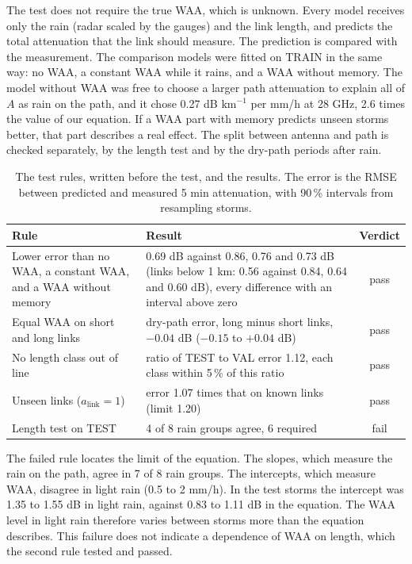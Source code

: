 \documentclass[11pt,a4paper]{article}
\newcommand{\alink}{a_{\mathrm{link}}}
\begin{document}
The test does not require the true WAA, which is unknown. Every model receives only the rain (radar scaled by the gauges) and the
link length, and predicts the total attenuation that the link should measure. The prediction is compared with the measurement.
The comparison models were fitted on TRAIN in the same way: no WAA, a constant WAA while it rains, and a WAA without memory. The
model without WAA was free to choose a larger path attenuation to explain all of $A$ as rain on the path, and it chose
0.27 dB km$^{-1}$ per mm/h at 28 GHz, 2.6 times the value of our equation. If a WAA part with memory predicts unseen storms
better, that part describes a real effect. The split between antenna and path is checked separately, by the length test and by
the dry-path periods after rain.

\begin{table}[H]
\centering\small
\caption{The test rules, written before the test, and the results. The error is the RMSE between predicted and measured
5 min attenuation, with 90\,\% intervals from resampling storms.}
\label{tab:test}
\begin{tabularx}{\textwidth}{>{\raggedright\arraybackslash}p{}Lc}
\toprule
Rule & Result & Verdict\\
\midrule
Lower error than no WAA, a constant WAA, and a WAA without memory & 0.69 dB against 0.86, 0.76 and 0.73 dB (links below 1 km: 0.56 against 0.84, 0.64 and 0.60 dB), every difference with an interval above zero & pass\\
Equal WAA on short and long links & dry-path error, long minus short links, $-0.04$ dB ($-0.15$ to $+0.04$ dB) & pass\\
No length class out of line & ratio of TEST to VAL error 1.12, each class within 5\,\% of this ratio & pass\\
Unseen links ($\alink = 1$) & error 1.07 times that on known links (limit 1.20) & pass\\
Length test on TEST & 4 of 8 rain groups agree, 6 required & fail\\
\bottomrule
\end{tabularx}
\end{table}

The failed rule locates the limit of the equation. The slopes, which measure the rain on the path, agree in 7 of 8 rain groups.
The intercepts, which measure WAA, disagree in light rain (0.5 to 2 mm/h). In the test storms the intercept was 1.35 to 1.55 dB
in light rain, against 0.83 to 1.11 dB in the equation. The WAA level in light rain therefore varies between storms more than
the equation describes. This failure does not indicate a dependence of WAA on length, which the second rule tested and passed.
\end{document}
